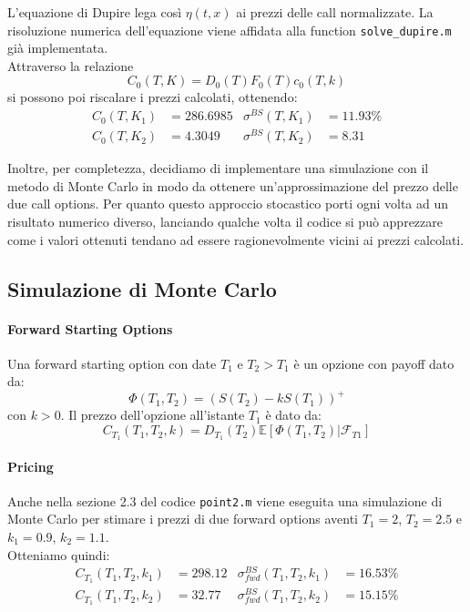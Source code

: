 \documentclass[11pt]{article}
\begin{document}
L'equazione di Dupire lega così $\eta(t,x)$ ai prezzi delle call normalizzate. La risoluzione numerica dell'equazione viene affidata alla function \texttt{solve\_dupire.m} già implementata.\\
Attraverso la relazione $$C_0(T,K) = D_0(T)F_0(T)c_0(T,k)$$ 
si possono poi riscalare i prezzi calcolati, ottenendo:
\begin{align*}
C_0(T,K_1) &= 286.6985 & \sigma^{BS}(T,K_1) &= 11.93\%\\
C_0(T,K_2) &= 4.3049 & \sigma^{BS}(T,K_2) &= 8.31
\end{align*}

Inoltre, per completezza, decidiamo di implementare una simulazione con il metodo di Monte Carlo in modo da ottenere un'approssimazione del prezzo delle due call options. Per quanto questo approccio stocastico porti ogni volta ad un risultato numerico diverso, lanciando qualche volta il codice si può apprezzare come i valori ottenuti tendano ad essere ragionevolmente vicini ai prezzi calcolati. 
 

\subsection{Simulazione di Monte Carlo}
\paragraph{Forward Starting Options}
Una forward starting option con date $T_1$ e $T_2 > T_1$ è un opzione con payoff dato da:
\begin{equation}
\Phi(T_1,T_2) = (S(T_2)-kS(T_1))^+
\end{equation}
con $k>0$. Il prezzo dell'opzione all'istante $T_1$ è dato da:
\begin{equation}
C_{T_1}(T_1,T_2,k)= D_{T_1}(T_2)\mathbb{E}[\Phi(T_1,T_2)|\mathcal{F}_{T1}]
\end{equation}

\paragraph{Pricing}
Anche nella sezione 2.3 del codice \texttt{point2.m} viene eseguita una simulazione di Monte Carlo per stimare i prezzi di due forward options aventi $T_1 = 2$, $T_2 = 2.5$ e $k_1=0.9$, $k_2=1.1$.\\
Otteniamo quindi:
\begin{align*}
C_{T_1}(T_1,T_2,k_1) &= 298.12 & \sigma^{BS}_{fwd}(T_1,T_2,k_1) &= 16.53\%\\
C_{T_1}(T_1,T_2,k_2) &= 32.77 & \sigma^{BS}_{fwd}(T_1,T_2,k_2) &= 15.15\%\\
\end{align*}
\end{document}
